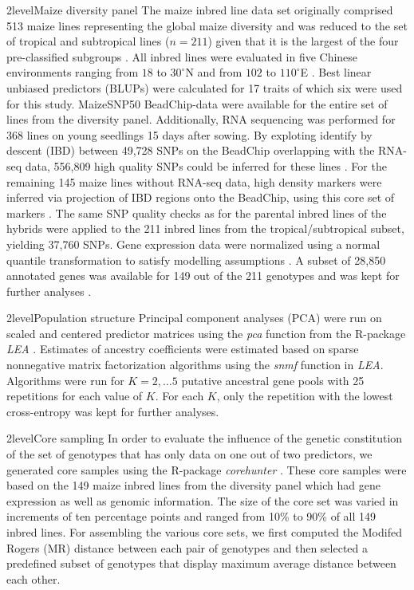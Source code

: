 \documentclass[12pt,titlepage]{article}
\begin{document}
\Genetics2level{Maize diversity panel}
The maize inbred line data set originally comprised 513 maize lines representing 
the global maize diversity and was reduced to the set of tropical and
subtropical lines ($n = 211$) given that it is the largest of the four
pre-classified subgroups \cite{Yang2014}.
All inbred lines were evaluated in five Chinese environments ranging from
$18$ to $30^{\circ}$N and from $102$ to $110^{\circ}$E \cite{Yang2014}.
Best linear unbiased predictors (BLUPs) were calculated for 17 traits of which 
six were used for this study.
MaizeSNP50 BeadChip-data were available for the entire set of lines from the
diversity panel.
Additionally, RNA sequencing was performed for 368 lines on young seedlings 15 
days after sowing.
By exploting identify by descent (IBD) between 49,728 SNPs on the BeadChip 
overlapping with the RNA-seq data, 556,809 high quality SNPs could be inferred 
for these lines \cite{Fu2013,Li2013}.
For the remaining 145 maize lines without RNA-seq data, high density markers
were inferred via projection of IBD regions onto the BeadChip, using this core 
set of markers \cite{Yang2014}.
The same SNP quality checks as for the parental inbred lines of the hybrids
were applied to the 211 inbred lines from the tropical/subtropical subset,
yielding 37,760 SNPs.
Gene expression data were normalized using a normal quantile transformation to
satisfy modelling assumptions \cite{Fu2013}.
A subset of 28,850 annotated genes was available for 149 out of the 211
genotypes and was kept for further analyses \cite{Li2013}.



\Genetics2level{Population structure}
Principal component analyses (PCA) were run on scaled and centered predictor 
matrices using the \emph{pca} function from the R-package \textit{LEA} 
\cite{Frichot2015}.
Estimates of ancestry coefficients were estimated based on sparse nonnegative
matrix factorization algorithms \cite{Frichot2014} using the \emph{snmf} 
function in \textit{LEA}.
Algorithms were run for $K=2, \dots 5$ putative ancestral gene pools with 25
repetitions for each value of $K$. 
For each $K$, only the repetition with the lowest cross-entropy was kept for 
further analyses.



\Genetics2level{Core sampling}
In order to evaluate the influence of the genetic constitution of the set of
genotypes that has only data on one out of two predictors, we generated core 
samples using the R-package \textit{corehunter} \cite{Thachuk2009}.
These core samples were based on the 149 maize inbred lines from the diversity
panel which had gene expression as well as genomic information.
The size of the core set was varied in increments of ten percentage points and 
ranged from 10\% to 90\% of all 149 inbred lines.
For assembling the various core sets, we first computed the Modifed Rogers (MR)
distance between each pair of genotypes and then selected a predefined subset
of genotypes that display maximum average distance between each other.
\end{document}
